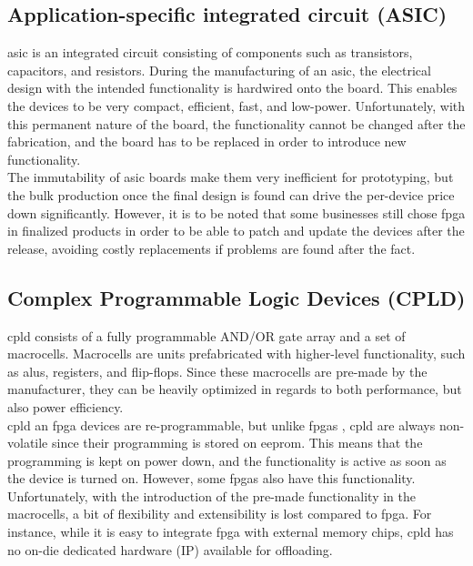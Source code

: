 \subsection{Application-specific integrated circuit (ASIC)}
\gls{asic} is an integrated circuit consisting of components such as
transistors, capacitors, and resistors. During the manufacturing of an
\gls{asic}, the electrical design with the intended functionality is hardwired
onto the board. This enables the devices to be very compact, efficient, fast,
and low-power. Unfortunately, with this permanent nature of the board, the
functionality cannot be changed after the fabrication, and the board has to be
replaced in order to introduce new functionality\cite{fpga_for_dummies}.\\
The immutability of \gls{asic} boards make them very inefficient for
prototyping, but the bulk production once the final design is found can drive
the per-device price down significantly. However, it is to be noted that
some businesses still chose \gls{fpga} in finalized products in order to be
able to patch and update the devices after the release, avoiding costly
replacements if problems are found after the fact.\cite{fpga_for_dummies}


\subsection{Complex Programmable Logic Devices (CPLD)}
\gls{cpld} consists of a fully programmable AND/OR gate array and a set of
macrocells. Macrocells are units prefabricated with higher-level functionality,
such as \gls{alu}s, registers, and flip-flops. Since these macrocells are
pre-made by the manufacturer, they can be heavily optimized in regards to both
performance, but also power efficiency.\cite{xilinx_cpld}\\
\gls{cpld} an \gls{fpga} devices are re-programmable, but unlike \gls{fpga}s
, \gls{cpld} are always
non-volatile since their programming is stored on \gls{eeprom}. This means that
the programming is kept on power down, and the functionality is active as soon
as the device is turned on\cite{xilinx_cpld}. However, some \gls{fpga}s also
have this functionality.\\
Unfortunately, with the introduction of the pre-made functionality in the
macrocells, a bit of flexibility and extensibility is lost compared to
\gls{fpga}. For instance, while it is easy to integrate \gls{fpga} with
external memory chips, \gls{cpld} has no on-die dedicated hardware (IP)
available for offloading\cite{numatolab_cpld_vs_fpga}.

